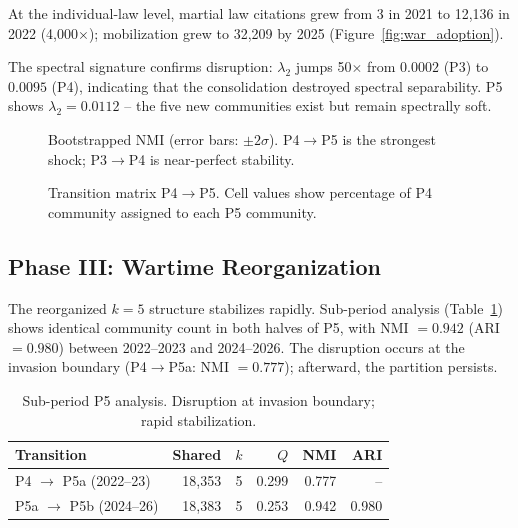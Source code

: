 \documentclass[11pt]{article}
\begin{document}
At the individual-law level, martial law citations grew from 3 in 2021 to 12{,}136 in 2022 (4{,}000$\times$); mobilization grew to 32{,}209 by 2025 (Figure~\ref{fig:war_adoption}).

The spectral signature confirms disruption: $\lambda_2$ jumps 50$\times$ from $0.0002$ (P3) to $0.0095$ (P4), indicating that the consolidation destroyed spectral separability.
P5 shows $\lambda_2 = 0.0112$ -- the five new communities exist but remain spectrally soft.

\begin{figure}[t]
\centering

\caption{Bootstrapped NMI (error bars: $\pm 2\sigma$). P4$\to$P5 is the strongest shock; P3$\to$P4 is near-perfect stability.}
\label{fig:nmi_bars}
\end{figure}

\begin{figure}[t]
\centering

\caption{Transition matrix P4$\to$P5. Cell values show percentage of P4 community assigned to each P5 community.}
\label{fig:transition}
\end{figure}

\subsection{Phase III: Wartime Reorganization}

The reorganized $k = 5$ structure stabilizes rapidly.
Sub-period analysis (Table~\ref{tab:subperiod}) shows identical community count in both halves of P5, with NMI $= 0.942$ (ARI $= 0.980$) between 2022--2023 and 2024--2026.
The disruption occurs at the invasion boundary (P4$\to$P5a: NMI $= 0.777$); afterward, the partition persists.

\begin{table}[t]
\centering
\small
\caption{Sub-period P5 analysis. Disruption at invasion boundary; rapid stabilization.}
\label{tab:subperiod}
\begin{tabular}{@{}lrrrrr@{}}
\toprule
\textbf{Transition} & \textbf{Shared} & $k$ & $Q$ & \textbf{NMI} & \textbf{ARI} \\
\midrule
P4 $\to$ P5a (2022--23) & 18,353 & 5 & 0.299 & 0.777 & -- \\
P5a $\to$ P5b (2024--26) & 18,383 & 5 & 0.253 & 0.942 & 0.980 \\
\bottomrule
\end{tabular}
\end{table}
\end{document}
